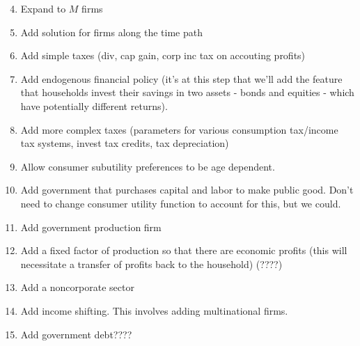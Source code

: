 \documentclass[letterpaper,12pt]{article}
\theoremstyle{definition}
\begin{document}
\begin{spacing}{1.5}
\begin{enumerate}
\setcounter{enumi}{3}
\item Expand to $M$ firms
\item Add solution for firms along the time path
\item Add simple taxes (div, cap gain, corp inc tax on accouting profits)
\item Add endogenous financial policy (it's at this step that we'll add the feature that households invest their savings in two assets - bonds and equities - which have potentially different returns).
\item Add more complex taxes (parameters for various consumption tax/income tax systems, invest tax credits, tax depreciation)
\item Allow consumer subutility preferences to be age dependent.
\item Add government that purchases capital and labor to make public good.  Don't need to change consumer utility function to account for this, but we could.
\item Add government production firm
\item Add a fixed factor of production so that there are economic profits (this will necessitate a transfer of profits back to the household) (????)
\item Add a noncorporate sector
\item Add income shifting.  This involves adding multinational firms.
\item Add government debt????
\end{enumerate}


\end{spacing}
\end{document}
